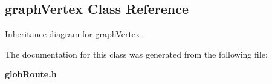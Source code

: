\subsection{graph\-Vertex  Class Reference}
\label{graphVertex}
Inheritance diagram for graph\-Vertex:\begin{figure}[H]
\begin{center}
\leavevmode
\setlength{\epsfysize}{2cm}
\end{center}
\end{figure}


The documentation for this class was generated from the following file:\begin{CompactItemize}
\item 
{\bf glob\-Route.h}\end{CompactItemize}
